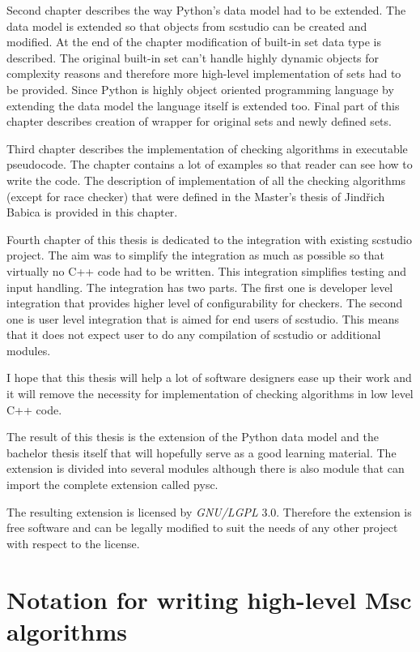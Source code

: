 \documentclass[11pt,oneside]{fithesis2}
\begin{document}
Second chapter describes the way Python's data model had to be extended. The data model is extended so that objects from scstudio can be created and modified. At the end of the chapter modification of built-in set data type is described. The original built-in set can't handle highly dynamic objects for complexity reasons and therefore more high-level implementation of sets had to be provided. Since Python is highly object oriented programming language by extending the data model the language itself is extended too. Final part of this chapter describes creation of wrapper for original sets and newly defined sets.

Third chapter describes the implementation of checking algorithms in executable pseudocode. The chapter contains a lot of examples so that reader can see how to write the code. The description of implementation of all the checking algorithms (except for race checker) that were defined in the Master's thesis of Jindřich Babica\cite{babica} is provided in this chapter.

Fourth chapter of this thesis is dedicated to the integration with existing scstudio project. The aim was to simplify the integration as much as possible so that virtually no C++ code had to be written. This integration simplifies testing and input handling. The integration has two parts. The first one is developer level integration that provides higher level of configurability for checkers. The second one is user level integration that is aimed for end users of scstudio. This means that it does not expect user to do any compilation of scstudio or additional modules.

I hope that this thesis will help a lot of software designers ease up their work and it will remove the necessity for implementation of checking algorithms in low level C++ code.

The result of this thesis is the extension of the Python data model and the bachelor thesis itself that will hopefully serve as a good learning material. The extension is divided into several modules although there is also module that can import the complete extension called pysc.

The resulting extension is licensed by \textit{GNU/LGPL} 3.0\cite{lgpl}. Therefore the extension is free software and can be legally modified to suit the needs of any other project with respect to the license.

\chapter{Notation for writing high-level Msc algorithms}
\end{document}
